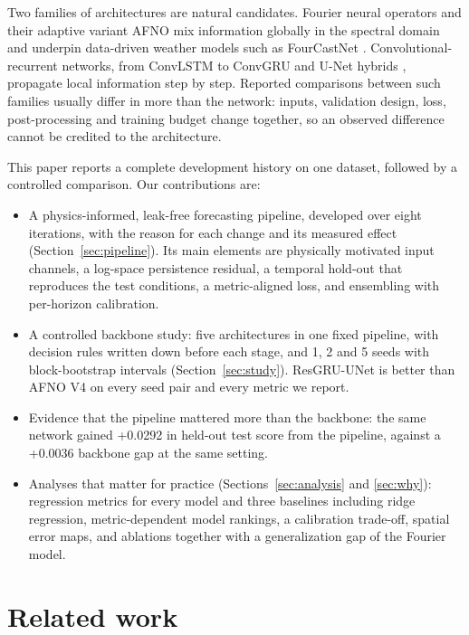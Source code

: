 \documentclass[10pt]{article}
\begin{document}
Two families of architectures are natural candidates. Fourier neural operators \citep{li2021fno} and their adaptive variant AFNO \citep{guibas2022afno} mix information globally in the spectral domain and underpin data-driven weather models such as FourCastNet \citep{pathak2022fourcastnet}. Convolutional-recurrent networks, from ConvLSTM \citep{shi2015convlstm} to ConvGRU \citep{ballas2016convgru} and U-Net hybrids \citep{ronneberger2015unet,leinonen2021}, propagate local information step by step. Reported comparisons between such families usually differ in more than the network: inputs, validation design, loss, post-processing and training budget change together, so an observed difference cannot be credited to the architecture.

This paper reports a complete development history on one dataset, followed by a controlled comparison. Our contributions are:
\begin{itemize}[leftmargin=14pt]
\item A physics-informed, leak-free forecasting pipeline, developed over eight iterations, with the reason for each change and its measured effect (Section~\ref{sec:pipeline}). Its main elements are physically motivated input channels, a log-space persistence residual, a temporal hold-out that reproduces the test conditions, a metric-aligned loss, and ensembling with per-horizon calibration.
\item A controlled backbone study: five architectures in one fixed pipeline, with decision rules written down before each stage, and 1, 2 and 5 seeds with block-bootstrap intervals (Section~\ref{sec:study}). ResGRU-UNet is better than AFNO V4 on every seed pair and every metric we report.
\item Evidence that the pipeline mattered more than the backbone: the same network gained +0.0292 in held-out test score from the pipeline, against a +0.0036 backbone gap at the same setting.
\item Analyses that matter for practice (Sections~\ref{sec:analysis} and \ref{sec:why}): regression metrics for every model and three baselines including ridge regression, metric-dependent model rankings, a calibration trade-off, spatial error maps, and ablations together with a generalization gap of the Fourier model.
\end{itemize}

\section{Related work}
\end{document}
